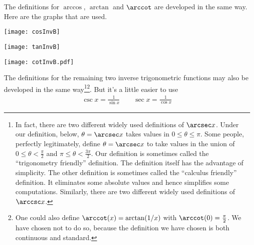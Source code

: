 The definitions for $\arccos$, $\arctan$ and $\arccot$ are developed in 
the same way. Here are the graphs that are used.
\begin{efig}
\begin{center}
  \texttt{[image: cosInvB]}
\end{center}
\begin{center}
  \texttt{[image: tanInvB]}
\end{center}
\begin{center}
  \texttt{[image: cotInvB.pdf]}
\end{center}
\end{efig}
The definitions for the remaining two inverse trigonometric functions
may also be developed in the same way\footnote{In fact, there are two 
different widely used definitions of $\arcsec x$. Under our definition, below, $\theta=\arcsec x$ takes values in $0\le\theta\le\pi$. Some people, 
perfectly legitimately, define $\theta=\arcsec x$ to
take values in the union of $0\le \theta<\frac{\pi}{2}$ and $\pi\le\theta<\frac{3\pi}{2}$.
Our definition is sometimes called the ``trigonometry friendly'' definition.
The definition itself has the advantage of simplicity. The other definition is sometimes called the ``calculus friendly'' definition. It eliminates some absolute values and hence simplifies some computations. Similarly, there are two different widely used definitions of $\arccsc x$.}\footnote{One could also define 
$\arccot(x)=\arctan(1/x)$ with $\arccot(0)=\frac{\pi}{2}$. We have chosen not to do so, because the definition we have chosen is both continuous and standard.}. But it's a little easier to use
\begin{align*}
\csc x=\frac{1}{\sin x} \qquad
\sec x=\frac{1}{\cos x} 
\end{align*}

